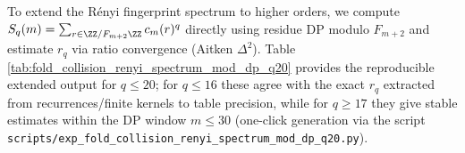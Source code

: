 \begin{remark}[Extended fingerprint (reproducible): \texorpdfstring{$r_q$}{rq} and \texorpdfstring{$h_q$}{hq} for \texorpdfstring{$q\le 20$}{q<=20}]\label{rem:pom-renyi-spectrum-q20}
To extend the R\'enyi fingerprint spectrum to higher orders, we compute
\(
S_q(m)=\sum_{r\in\ZZ/F_{m+2}\ZZ}c_m(r)^q
\)
directly using residue DP modulo \(F_{m+2}\) and estimate \(r_q\) via ratio convergence (Aitken \(\Delta^2\)).
Table \ref{tab:fold_collision_renyi_spectrum_mod_dp_q20} provides the reproducible extended output for \(q\le 20\); for \(q\le 16\) these agree with the exact \(r_q\) extracted from recurrences/finite kernels to table precision, while for \(q\ge 17\) they give stable estimates within the DP window \(m\le 30\) (one-click generation via the script \texttt{scripts/exp\_fold\_collision\_renyi\_spectrum\_mod\_dp\_q20.py}).
\end{remark}

